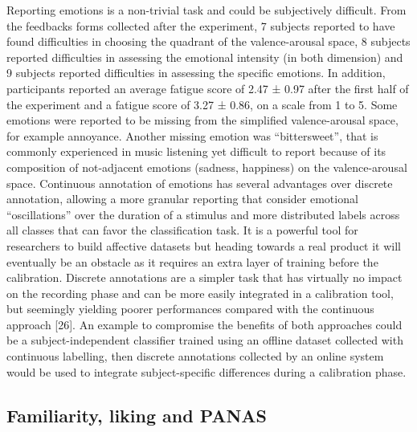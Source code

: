 Reporting emotions is a non-trivial task and could be subjectively difficult. From the feedbacks forms collected after the experiment, 7 subjects reported to have found difficulties in choosing the quadrant of the valence-arousal space, 8 subjects reported difficulties in assessing the emotional intensity (in both dimension) and 9 subjects reported difficulties in assessing the specific emotions. In addition, participants reported an average fatigue score of 2.47 ± 0.97 after the first half of the experiment and a fatigue score of 3.27 ± 0.86, on a scale from 1 to 5. Some emotions were reported to be missing from the simplified valence-arousal space, for example annoyance. Another missing emotion was “bittersweet”, that is commonly experienced in music listening yet difficult to report because of its composition of not-adjacent emotions (sadness, happiness) on the valence-arousal space. Continuous annotation of emotions has several advantages over discrete annotation, allowing a more granular reporting that consider emotional “oscillations” over the duration of a stimulus and more distributed labels across all classes that can favor the classification task.  It is a powerful tool for researchers to build affective datasets but heading towards a real product it will eventually be an obstacle as it requires an extra layer of training before the calibration. Discrete annotations are a simpler task that has virtually no impact on the recording phase and can be more easily integrated in a calibration tool, but seemingly yielding poorer performances compared with the continuous approach [26]. An example to compromise the benefits of both approaches could be a subject-independent classifier trained using an offline dataset collected with continuous labelling, then discrete annotations collected by an online system would be used to integrate subject-specific differences during a calibration phase.

\subsection{Familiarity, liking and PANAS}

